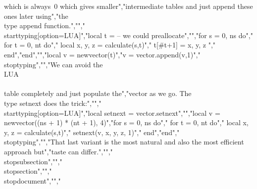 which is always~0 which gives smaller","intermediate tables and just append these ones later using","the \\type {append} function.","","\\starttyping[option=LUA]","local t = { }  -- we could preallocate","","for s = 0, ns do","    for t = 0, nt do","        local x, y, z = calculate(s,t)","        t[#t+1] = { x, y, z }","   end","end","","local v = newvector(t)","v = vector.append(v,1)","\\stoptyping","","We can avoid the \\LUA\\\\ table completely and just populate the","vector as we go. The \\type {setnext} does the trick:","","\\starttyping[option=LUA]","local setnext = vector.setnext","","local v = newvector((ns + 1) * (nt + 1), 4)","for s = 0, ns do","    for t = 0, nt do","        local x, y, z = calculate(s,t)","        setnext(v, x, y, z, 1)","   end","end","\\stoptyping","","That last variant is the most natural and also the most efficient approach but","taste can differ.","","\\stopsubsection","","\\stopsection","","\\stopdocument","","%